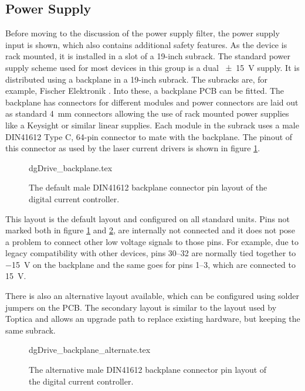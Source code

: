 \subsection{Power Supply}
Before moving to the discussion of the power supply filter, the power supply input is shown, which also contains additional safety features. As the device is rack mounted, it is installed in a slot of a 19-inch subrack. The standard power supply scheme used for most devices in this group is a dual \qty{\pm 15}{\V} supply. It is distributed using a  backplane in a 19-inch subrack. The subracks are, for example, Fischer Elektronik . Into these, a backplane PCB \cite{git_backplane} can be fitted. The backplane has connectors for different modules and power connectors are laid out as standard \qty{4}{\mm} connectors allowing the use of rack mounted power supplies like a Keysight  or similar linear supplies. Each module in the subrack uses a male DIN41612 Type C, 64-pin connector to mate with the backplane. The pinout of this connector as used by the laser current drivers is shown in figure \ref{fig:laser_driver_connector}.
\begin{figure}[ht]
    \centering
        {dgDrive_backplane.tex}
    \caption{The default male DIN41612 backplane connector pin layout of the digital current controller.}
    \label{fig:laser_driver_connector}
\end{figure}

This layout is the default layout and configured on all standard units. Pins not marked both in figure \ref{fig:laser_driver_connector} and \ref{fig:laser_driver_connector_alternative}, are internally not connected and it does not pose a problem to connect other low voltage signals to those pins. For example, due to legacy compatibility with other devices, pins \numrange{30}{32} are normally tied together to \qty{-15}{\V} on the backplane and the same goes for pins \numrange{1}{3}, which are connected to \qty{15}{\V}.

There is also an alternative layout available, which can be configured using solder jumpers on the PCB. The secondary layout is similar to the layout used by Toptica and allows an upgrade path to replace existing hardware, but keeping the same subrack.
\begin{figure}[ht]
    \centering
        {dgDrive_backplane_alternate.tex}
    \caption{The alternative male DIN41612 backplane connector pin layout of the digital current controller.}
    \label{fig:laser_driver_connector_alternative}
\end{figure}

